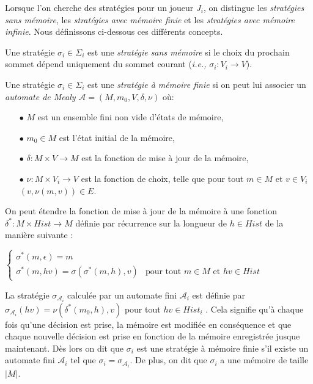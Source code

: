 Lorsque l'on cherche des stratégies pour un joueur $J_{i}$, on distingue les \textit{stratégies sans mémoire}, les \textit{stratégies avec mémoire finie} et les \textit{stratégies avec mémoire infinie}. Nous définissons ci-dessous ces différents concepts.

\begin{defi}
	
	Une stratégie $\sigma _{i} \in \Sigma _{i}$ est une \textit{stratégie sans mémoire} si le choix du prochain sommet dépend uniquement du sommet courant (\emph{i.e.,} $\sigma _{i}: V_{i} \rightarrow V$).
\end{defi}

\begin{defi}
	
	Une stratégie $\sigma _{i} \in \Sigma _{i}$ est une \textit{stratégie à mémoire finie} si on peut lui associer un \textit{automate de Mealy} $\mathcal{A} = (M, m_{0}, V, \delta, \nu)$ où:
	\begin{enumerate}
		\item[$\bullet$] $M$ est un ensemble fini non vide d'états de mémoire,
		\item[$\bullet$] $m_{0} \in M$ est l'état initial de la mémoire,
		\item[$\bullet$] $\delta : M \times V \rightarrow M$ est la fonction de mise à jour de la mémoire,
		\item[$\bullet$] $ \nu: M \times V_{i} \rightarrow V$ est la fonction de choix, telle que pour tout $m \in M$ et $v\in V_{i}$ $(v, \nu(m,v))\in E$.\end{enumerate}
		
		On peut étendre la fonction de mise à jour de la mémoire à une fonction $\delta ^{*}: M \times Hist \rightarrow M$ définie par récurrence sur la longueur de $h \in Hist$ de la manière suivante :\\\begin{center}
		 $\begin{cases}
																	\sigma^{*}(m,\epsilon) = m	\\
																	\sigma^{*}(m,hv)=\sigma(\sigma^{*}(m,h),v) & \text{pour tout } m\in M \text{ et } hv\in Hist
																	\end{cases}$ \end{center}
																	
		La stratégie $\sigma _{\mathcal{A}_{i}}$ calculée par un automate fini $\mathcal{A}_{i}$ est définie  par\\
 $\sigma _{\mathcal{A}_{i}}(hv) = \nu(\delta^{*}(m_{0},h),v)$ pour tout $hv \in Hist_{i}$ . Cela signifie qu'à chaque fois qu'une décision est prise, la mémoire est modifiée en conséquence et que chaque nouvelle décision est prise en fonction de la mémoire enregistrée jusque maintenant.
		Dès lors on dit que $\sigma _{i}$ est une stratégie à mémoire finie s'il existe un automate fini $\mathcal{A}_{i}$ tel que $\sigma _{i} = \sigma _{\mathcal{A}_{i}}$. De plus, on dit que $\sigma_i$ a une mémoire de taille $|M|$.

\end{defi}

